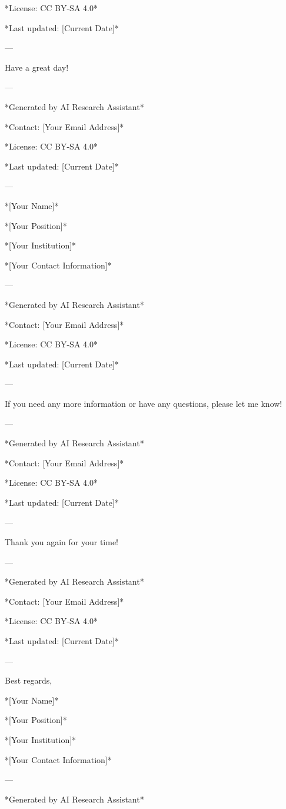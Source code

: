 *License: CC BY-SA 4.0* 

*Last updated: [Current Date]* 

--- 

Have a great day! 

--- 

*Generated by AI Research Assistant* 

*Contact: [Your Email Address]* 

*License: CC BY-SA 4.0* 

*Last updated: [Current Date]* 

--- 

*[Your Name]* 

*[Your Position]* 

*[Your Institution]* 

*[Your Contact Information]* 

--- 

*Generated by AI Research Assistant* 

*Contact: [Your Email Address]* 

*License: CC BY-SA 4.0* 

*Last updated: [Current Date]* 

--- 

If you need any more information or have any questions, please let me know! 

--- 

*Generated by AI Research Assistant* 

*Contact: [Your Email Address]* 

*License: CC BY-SA 4.0* 

*Last updated: [Current Date]* 

--- 

Thank you again for your time! 

--- 

*Generated by AI Research Assistant* 

*Contact: [Your Email Address]* 

*License: CC BY-SA 4.0* 

*Last updated: [Current Date]* 

--- 

Best regards, 

*[Your Name]* 

*[Your Position]* 

*[Your Institution]* 

*[Your Contact Information]* 

--- 

*Generated by AI Research Assistant* 

